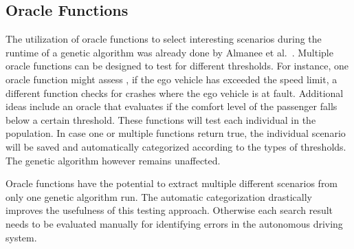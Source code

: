\subsection{Oracle Functions}
The utilization of oracle functions to select interesting scenarios during the runtime of a genetic algorithm was already done by Almanee et al.~\cite{almanee_scenorita_2021}. Multiple oracle functions can be designed to test for different thresholds. For instance, one oracle function might assess , if the ego vehicle has exceeded the speed limit, a different function checks for crashes where the ego vehicle is at fault. Additional ideas include an oracle that evaluates if the comfort level of the passenger falls below a certain threshold. These functions will test each individual in the population. In case one or multiple functions return true, the individual scenario will be saved and automatically categorized according to the types of thresholds. The genetic algorithm however remains unaffected.

Oracle functions have the potential to extract multiple different scenarios from only one genetic algorithm run. The automatic categorization drastically improves the usefulness of this testing approach. Otherwise each search result needs to be evaluated manually for identifying errors in the autonomous driving system.
